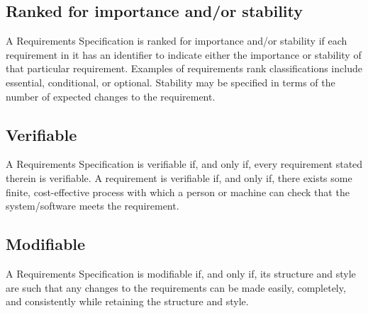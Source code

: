 \documentclass[Main]{subfiles}
\begin{document}
\subsection{Ranked for importance and/or stability}
A Requirements Specification is ranked for importance and/or stability if each requirement in it has an identifier to indicate either the importance or stability of that particular requirement. Examples of requirements rank classifications include essential, conditional, or optional. Stability may be specified in terms of the number of expected changes to the requirement. 

\begin{CheckTable}

\end{CheckTable}

\subsection{Verifiable}
A Requirements Specification is verifiable if, and only if, every requirement stated therein is verifiable. A requirement is verifiable if, and only if, there exists some finite, cost-effective process with which a person or machine can check that the system/software meets the requirement.

\begin{CheckTable}
\end{CheckTable}

\subsection{Modifiable}
A Requirements Specification is modifiable if, and only if, its structure and style are such that any changes to the requirements can be made easily, completely, and consistently while retaining the structure and style.

\begin{CheckTable}


\end{CheckTable}
\end{document}
